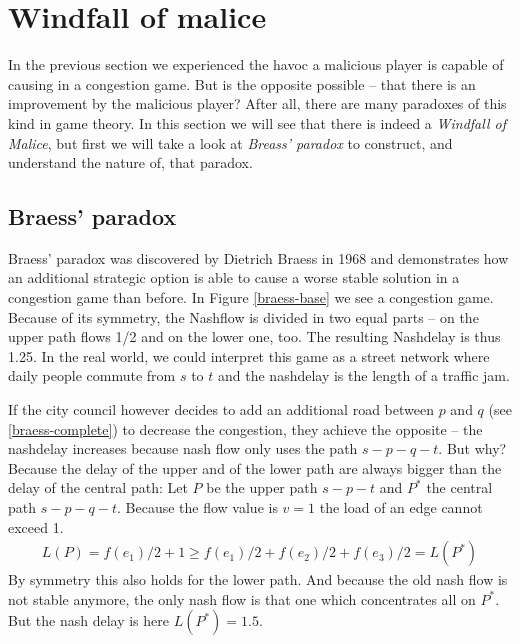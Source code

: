 \section{Windfall of malice}

In the previous section we experienced the havoc a malicious player is capable of causing in a congestion game.
But is the opposite possible -- that there is an improvement by the malicious player?
After all, there are many paradoxes of this kind in game theory.
In this section we will see that there is indeed a \emph{Windfall of Malice}, but first we will take a look at \emph{Breass' paradox} to construct, and understand the nature of, that paradox.

\subsection{Braess' paradox}

Braess' paradox was discovered by Dietrich Braess in 1968 and demonstrates how an additional strategic option is able to cause a worse stable solution in a congestion game than before.
In Figure \ref{braess-base} we see a congestion game.
Because of its symmetry, the Nashflow is divided in two equal parts -- on the upper path flows 1/2 and on the lower one, too.
The resulting Nashdelay is thus 1.25.
In the real world, we could interpret this game as a street network where daily people commute from $s$ to $t$ and the nashdelay is the length of a traffic jam.

If the city council however decides to add an additional road between $p$ and $q$ (see \ref{braess-complete}) to decrease the congestion, they achieve the opposite -- the nashdelay increases because nash flow only uses the path $s-p-q-t$.
But why?
Because the delay of the upper and of the lower path are always bigger than the delay of the central path:
Let $P$ be the upper path $s-p-t$ and $P^*$ the central path $s-p-q-t$.
Because the flow value is $v=1$ the load of an edge cannot exceed 1.
\begin{align*}
	L(P) = f(e_1)/2 + 1 \geq f(e_1)/2 + f(e_2)/2 + f(e_3)/2 = L(P^*) 
\end{align*}
By symmetry this also holds for the lower path.
And because the old nash flow is not stable anymore, the only nash flow is that one which concentrates all on $P^*$.
But the nash delay is here $L(P^*) = 1.5$.


